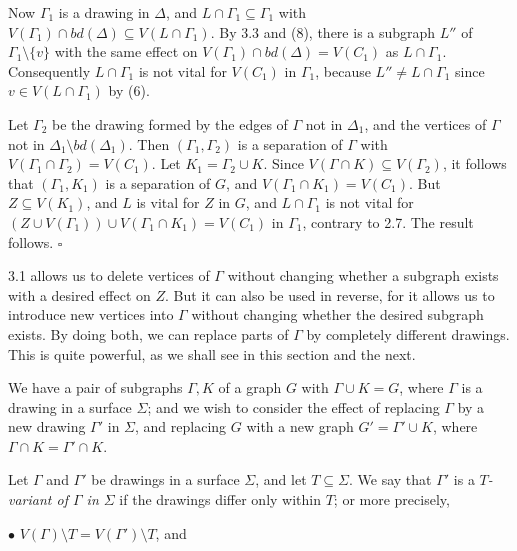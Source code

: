 Now $\Gamma_1$ is a drawing in $\Delta$, and $L \cap \Gamma_1 \subseteq \Gamma_1$ with $V(\Gamma_1) \cap bd(\Delta) \subseteq V(L \cap \Gamma_1)$. By 3.3 and (8), there is a subgraph $L''$ of $\Gamma_1 \setminus \{v\}$ with the same effect on $V(\Gamma_1) \cap bd(\Delta) = V(C_1)$ as $L \cap \Gamma_1$. Consequently $L \cap \Gamma_1$ is not vital for $V(C_1)$ in $\Gamma_1$, because $L'' \ne L \cap \Gamma_1$ since $v \in V(L \cap \Gamma_1)$ by (6).

Let $\Gamma_2$ be the drawing formed by the edges of $\Gamma$ not in $\Delta_1$, and the vertices of $\Gamma$ not in $\Delta_1 \setminus bd(\Delta_1)$. Then $(\Gamma_1, \Gamma_2)$ is a separation of $\Gamma$ with $V(\Gamma_1 \cap \Gamma_2) = V(C_1)$. Let $K_1 = \Gamma_2 \cup K$. Since $V(\Gamma \cap K) \subseteq V(\Gamma_2)$, it follows that $(\Gamma_1, K_1)$ is a separation of $G$, and $V(\Gamma_1 \cap K_1) = V(C_1)$. But $Z \subseteq V(K_1)$, and $L$ is vital for $Z$ in $G$, and $L \cap \Gamma_1$ is not vital for $(Z \cup V(\Gamma_1)) \cup V(\Gamma_1 \cap K_1) = V(C_1)$ in $\Gamma_1$, contrary to 2.7. The result follows. $\square$


3.1 allows us to delete vertices of $\Gamma$ without changing whether a subgraph exists with a desired effect on $Z$. But it can also be used in reverse, for it allows us to introduce new vertices into $\Gamma$ without changing whether the desired subgraph exists. By doing both, we can replace parts of $\Gamma$ by completely different drawings. This is quite powerful, as we shall see in this section and the next.

We have a pair of subgraphs $\Gamma, K$ of a graph $G$ with $\Gamma \cup K = G$, where $\Gamma$ is a drawing in a surface $\Sigma$; and we wish to consider the effect of replacing $\Gamma$ by a new drawing $\Gamma'$ in $\Sigma$, and replacing $G$ with a new graph $G' = \Gamma' \cup K$, where $\Gamma \cap K = \Gamma' \cap K$.

Let $\Gamma$ and $\Gamma'$ be drawings in a surface $\Sigma$, and let $T \subseteq \Sigma$. We say that $\Gamma'$ is a \textit{$T$-variant of $\Gamma$ in $\Sigma$} if the drawings differ only within $T$; or more precisely,

\hspace*{12pt}$\bullet$ $V(\Gamma) \setminus T = V(\Gamma') \setminus T$, and

